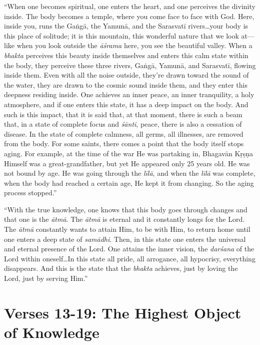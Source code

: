 \documentclass[12pt, twoside, openright]{memoir}
\begin{document}
\enquote{When one becomes spiritual, one enters the heart, and one perceives the divinity inside. The body becomes a temple, where you come face to face with God. Here, inside you, runs the Gaṅgā, the Yamunā, and the Sarasvatī rivers\ldots your body is this place of solitude; it is this mountain, this wonderful nature that we look at---like when you look outside the \textit{āśrama} here, you see the beautiful valley. When a \textit{bhakta} perceives this beauty inside themselves and enters this calm state within the body, they perceive these three rivers, Gaṅgā, Yamunā, and Sarasvatī, flowing inside them. Even with all the noise outside, they’re drawn toward the sound of the water, they are drawn to the cosmic sound inside them, and they enter this deepness residing inside. One achieves an inner peace, an inner tranquility, a holy atmosphere, and if one enters this state, it has a deep impact on the body. And such is this impact, that it is said that, at that moment, there is such a beam that, in a state of complete focus and \textit{śānti}, peace, there is also a cessation of disease. In the state of complete calmness, all germs, all illnesses, are removed from the body. For some saints, there comes a point that the body itself stops aging. For example, at the time of the war He was partaking in, Bhagavān Kṛṣṇa Himself was a great-grandfather, but yet He appeared only 25 years old. He was not bound by age. He was going through the \textit{līlā}, and when the \textit{līlā} was complete, when the body had reached a certain age, He kept it from changing. So the aging process stopped.}

\enquote{With the true knowledge, one knows that this body goes through changes and that one is the \textit{ātmā}. The \textit{ātmā} is eternal and it constantly longs for the Lord. The \textit{ātmā} constantly wants to attain Him, to be with Him, to return home until one enters a deep state of \textit{samādhi}. Then, in this state one enters the universal and eternal presence of the Lord. One attains the inner vision, the \textit{darśana} of the Lord within oneself\ldots In this state all pride, all arrogance, all hypocrisy, everything disappears. And this is the state that the \textit{bhakta} achieves, just by loving the Lord, just by serving Him.}

\section{Verses 13-19: The Highest Object of Knowledge}\label{sec-verses-13-19-the-highest-object-of-knowledge}
\end{document}
